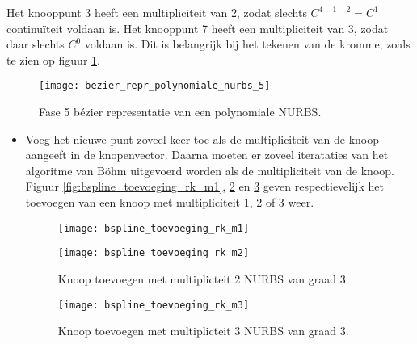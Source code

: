 \begin{itemize}
{\begin{itemize}
			Het knooppunt 3 heeft een multipliciteit van 2, zodat slechts $C^{4 - 1 - 2} = C^1$ continuïteit voldaan is. Het knooppunt 7 heeft een multipliciteit van 3, zodat daar slechts $C^0$ voldaan is. Dit is belangrijk bij het tekenen van de kromme, zoals te zien op figuur \ref{fig:bezier_repr_polynomiale_nurbs_5}.
			\begin{figure}[ht]
				\centering
				\texttt{[image: bezier\_repr\_polynomiale\_nurbs\_5]}	
				\caption{Fase 5 bézier representatie van een polynomiale NURBS.}
				\label{fig:bezier_repr_polynomiale_nurbs_5}
			\end{figure}
		\end{itemize}}
	{
		\begin{itemize} 
			\item Voeg het nieuwe punt zoveel keer toe als de multipliciteit van de knoop aangeeft in de knopenvector. Daarna moeten er zoveel iterataties van het algoritme van Böhm uitgevoerd worden als de multipliciteit van de knoop. Figuur \ref{fig:bspline_toevoeging_rk_m1}, \ref{fig:bspline_toevoeging_rk_m2} en \ref{fig:bspline_toevoeging_rk_m3} geven respectievelijk het toevoegen van een knoop met multipliciteit 1, 2 of 3 weer.
			\begin{figure}[ht]
				\begin{minipage}{0.5\textwidth}
					\centering
					\texttt{[image: bspline\_toevoeging\_rk\_m1]}	
					\caption{Knoop toevoegen met multiplicteit 1 bij een NURBS van graad 3.}
					\label{fig:bspline_toevoeging_rk_m1}
				\end{minipage}
				\begin{minipage}{0.5\textwidth}
					\centering
					\texttt{[image: bspline\_toevoeging\_rk\_m2]}	
					\caption{Knoop toevoegen met multiplicteit 2 NURBS van graad 3.}
					\label{fig:bspline_toevoeging_rk_m2}
				\end{minipage}
			\end{figure}
			\begin{figure}[ht]
				\centering
				\texttt{[image: bspline\_toevoeging\_rk\_m3]}	
				\caption{Knoop toevoegen met multiplicteit 3 NURBS van graad 3.}
				\label{fig:bspline_toevoeging_rk_m3}
			\end{figure}
		\end{itemize}
	}
\end{itemize}
